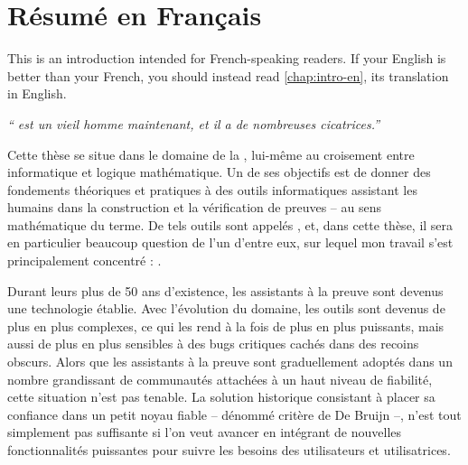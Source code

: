 \chapter{Résumé en Français}
\label{chap:intro-fr}

\begin{kaobox}[backgroundcolor=Black!10!White,frametitlebackgroundcolor=Black!10!White]
  This  is an introduction intended for French-speaking readers.
  If your English is better than your French,
  you should instead read \cref{chap:intro-en}, its translation in English.
\end{kaobox}

\emph{“ est un vieil homme maintenant, et il a de nombreuses cicatrices.”}
\vspace{-1.5em}
\begin{flushright}
\end{flushright}

\margintoc[4em]

Cette thèse se situe dans le domaine de la , lui-même au croisement entre informatique et logique mathématique.
Un de ses objectifs est de donner des fondements théoriques et pratiques
à des outils informatiques assistant les humains dans la construction
et la vérification de preuves – au sens mathématique du terme.
De tels outils sont appelés , et, dans cette thèse, il sera
en particulier beaucoup question de l’un d’entre eux,
sur lequel mon travail s’est principalement concentré : .

Durant leurs plus de 50 ans d’existence, les assistants à la preuve sont devenus une
technologie établie. Avec l’évolution du domaine, les outils sont devenus de plus en
plus complexes, ce qui les rend à la fois de plus en plus puissants, mais aussi de plus
en plus sensibles à des bugs critiques cachés dans des recoins obscurs. Alors que les
assistants à la preuve sont graduellement adoptés dans un nombre grandissant de communautés
attachées à un haut niveau de fiabilité, cette situation n’est pas tenable.
La solution historique consistant à placer sa confiance dans un petit noyau fiable
– dénommé critère de De Bruijn –, n’est tout simplement pas suffisante si l’on veut avancer
en intégrant de nouvelles fonctionnalités puissantes pour suivre les besoins des utilisateurs
et utilisatrices.

